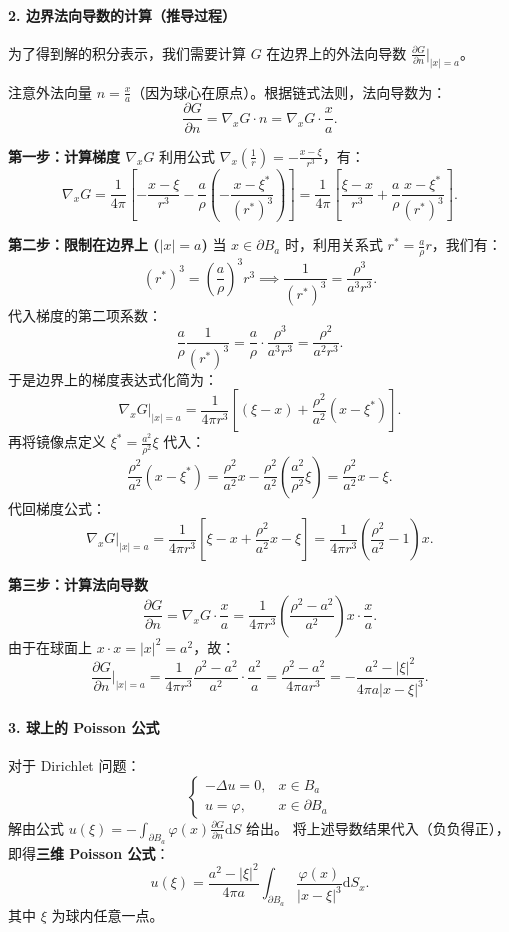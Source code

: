\documentclass[12pt,a4paper]{ctexart}
\begin{document}
	\paragraph{2. 边界法向导数的计算（推导过程）}
	为了得到解的积分表示，我们需要计算 $G$ 在边界上的外法向导数 $\frac{\partial G}{\partial n} \big|_{|x|=a}$。
	
	注意外法向量 $n = \frac{x}{a}$（因为球心在原点）。根据链式法则，法向导数为：
	\[
	\frac{\partial G}{\partial n} = \nabla_x G \cdot n = \nabla_x G \cdot \frac{x}{a}.
	\]
	
	\textbf{第一步：计算梯度 $\nabla_x G$}
	利用公式 $\nabla_x (\frac{1}{r}) = -\frac{x-\xi}{r^3}$，有：
	\[
	\nabla_x G = \frac{1}{4\pi} \left[ -\frac{x-\xi}{r^3} - \frac{a}{\rho} \left( -\frac{x-\xi^*}{(r^*)^3} \right) \right] 
	= \frac{1}{4\pi} \left[ \frac{\xi-x}{r^3} + \frac{a}{\rho} \frac{x-\xi^*}{(r^*)^3} \right].
	\]
	
	\textbf{第二步：限制在边界上 ($|x|=a$)}
	当 $x \in \partial B_a$ 时，利用关系式 $r^* = \frac{a}{\rho} r$，我们有：
	\[
	(r^*)^3 = \left( \frac{a}{\rho} \right)^3 r^3 \implies \frac{1}{(r^*)^3} = \frac{\rho^3}{a^3 r^3}.
	\]
	代入梯度的第二项系数：
	\[
	\frac{a}{\rho} \frac{1}{(r^*)^3} = \frac{a}{\rho} \cdot \frac{\rho^3}{a^3 r^3} = \frac{\rho^2}{a^2 r^3}.
	\]
	于是边界上的梯度表达式化简为：
	\[
	\nabla_x G \Big|_{|x|=a} = \frac{1}{4\pi r^3} \left[ (\xi-x) + \frac{\rho^2}{a^2} (x-\xi^*) \right].
	\]
	再将镜像点定义 $\xi^* = \frac{a^2}{\rho^2} \xi$ 代入：
	\[
	\frac{\rho^2}{a^2} (x-\xi^*) = \frac{\rho^2}{a^2} x - \frac{\rho^2}{a^2} \left( \frac{a^2}{\rho^2} \xi \right) = \frac{\rho^2}{a^2} x - \xi.
	\]
	代回梯度公式：
	\[
	\nabla_x G \Big|_{|x|=a} = \frac{1}{4\pi r^3} \left[ \xi - x + \frac{\rho^2}{a^2} x - \xi \right] 
	= \frac{1}{4\pi r^3} \left( \frac{\rho^2}{a^2} - 1 \right) x.
	\]
	
	\textbf{第三步：计算法向导数}
	\[
	\frac{\partial G}{\partial n} = \nabla_x G \cdot \frac{x}{a} 
	= \frac{1}{4\pi r^3} \left( \frac{\rho^2 - a^2}{a^2} \right) x \cdot \frac{x}{a}.
	\]
	由于在球面上 $x \cdot x = |x|^2 = a^2$，故：
	\begin{equation}
		\frac{\partial G}{\partial n} \Bigg|_{|x|=a} 
		= \frac{1}{4\pi r^3} \frac{\rho^2 - a^2}{a^2} \cdot \frac{a^2}{a} 
		= \frac{\rho^2 - a^2}{4\pi a r^3} 
		= - \frac{a^2 - |\xi|^2}{4\pi a |x-\xi|^3}.
	\end{equation}
	
	\paragraph{3. 球上的 Poisson 公式}
	对于 Dirichlet 问题：
	\[
	\begin{cases}
		-\Delta u = 0, & x \in B_a \\
		u = \varphi, & x \in \partial B_a
	\end{cases}
	\]
	解由公式 $u(\xi) = - \int_{\partial B_a} \varphi(x) \frac{\partial G}{\partial n} \mathrm{d}S$ 给出。
	将上述导数结果代入（负负得正），即得\textbf{三维 Poisson 公式}：
	\begin{equation}
		u(\xi) = \frac{a^2 - |\xi|^2}{4\pi a} \int_{\partial B_a} \frac{\varphi(x)}{|x-\xi|^3} \mathrm{d}S_x.
	\end{equation}
	其中 $\xi$ 为球内任意一点。
	
\end{document}
